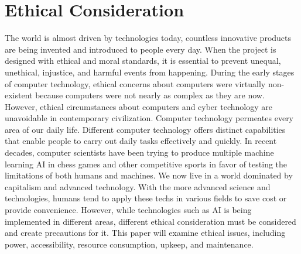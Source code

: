 \documentclass[10pt,twocolumn]{article}
\begin{document}
\section{Ethical Consideration}
    The world is almost driven by technologies today, countless innovative products are being invented and introduced to people every day. When the project is designed with ethical and moral standards, it is essential to prevent unequal, unethical, injustice, and harmful events from happening. During the early stages of computer technology, ethical concerns about computers were virtually non-existent because computers were not nearly as complex as they are now. However, ethical circumstances about computers and cyber technology are unavoidable in contemporary civilization. Computer technology permeates every area of our daily life. Different computer technology offers distinct capabilities that enable people to carry out daily tasks effectively and quickly. In recent decades, computer scientists have been trying to produce multiple machine learning AI in chess games and other competitive sports in favor of testing the limitations of both humans and machines. We now live in a world dominated by capitalism and advanced technology. With the more advanced science and technologies, humans tend to apply these techs in various fields to save cost or provide convenience. However, while technologies such as AI is being implemented in different areas, different ethical consideration must be considered and create precautions for it. This paper will examine ethical issues, including power, accessibility, resource consumption, upkeep, and maintenance.
\end{document}
